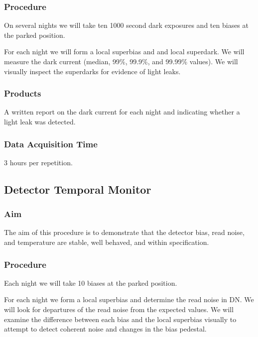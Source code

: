 \documentclass{article}
\begin{document}
\subsubsection{Procedure}

On several nights we will take ten 1000 second dark exposures and ten biases at the parked position.

For each night we will form a local superbias and and local superdark. We will measure the dark current (median, 99\%, 99.9\%, and 99.99\% values). We will visually inspect the superdarks for evidence of light leaks.

\subsubsection{Products}

A written report on the dark current for each night and indicating whether a light leak was detected.

\subsubsection{Data Acquisition Time}

3 hours per repetition.


\subsection{Detector Temporal Monitor}

\subsubsection{Aim}

The aim of this procedure is to demonstrate that the detector bias, read noise, and temperature are stable, well behaved, and within specification.

\subsubsection{Procedure}

Each night we will take 10 biases at the parked position.

For each night we form a local superbias and determine the read noise in DN. We will look for departures of the read noise from the expected values. We will examine the difference between each bias and the local superbias visually to attempt to detect coherent noise and changes in the bias pedestal.
\end{document}
